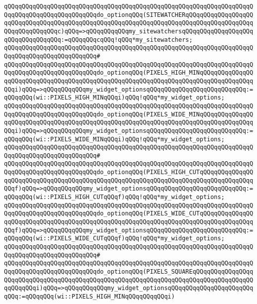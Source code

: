 \verb|qQQqqQQqqQQqqQQqqQQqqQQqqQQqqQQqqQQqqQQqqQQqqQQqqQQqqQQqqQQqqQQqqQQqqQQqqQQqqQQqqQQqqQQqqQQqqQQqdo_optionqQQq(SITEWATCHERqQQqqQQqqQQqqQQqqQQqqQQqqQQqqQQqqQQqqQQqqQQqqQQqqQQqqQQqqQQqqQQqqQQqqQQqqQQqqQQqqQQqqQQqqQQqqQQqqQQqqQQqc)qQQq=>qQQqqQQqqQQqmy_sitewatchersqQQqqQQqqQQqqQQqqQQqqQQqqQQqqQQqqQQq:=qQQqqQQqcqQQq!qQQq*my_sitewatchers;|\newline
\verb|qQQqqQQqqQQqqQQqqQQqqQQqqQQqqQQqqQQqqQQqqQQqqQQqqQQqqQQqqQQqqQQqqQQqqQQqqQQqqQQqqQQqqQQqqQQqqQQq#|\newline
\verb|qQQqqQQqqQQqqQQqqQQqqQQqqQQqqQQqqQQqqQQqqQQqqQQqqQQqqQQqqQQqqQQqqQQqqQQqqQQqqQQqqQQqqQQqqQQqqQQqdo_optionqQQq(PIXELS_HIGH_MINqQQqqQQqqQQqqQQqqQQqqQQqqQQqqQQqqQQqqQQqqQQqqQQqqQQqqQQqqQQqqQQqqQQqqQQqqQQqqQQqqQQqqQQqi)qQQq=>qQQqqQQqqQQqmy_widget_optionsqQQqqQQqqQQqqQQqqQQqqQQqqQQq:=qQQqqQQq(wi::PIXELS_HIGH_MINqQQqi)qQQq!qQQq*my_widget_options;|\newline
\verb|qQQqqQQqqQQqqQQqqQQqqQQqqQQqqQQqqQQqqQQqqQQqqQQqqQQqqQQqqQQqqQQqqQQqqQQqqQQqqQQqqQQqqQQqqQQqqQQqdo_optionqQQq(PIXELS_WIDE_MINqQQqqQQqqQQqqQQqqQQqqQQqqQQqqQQqqQQqqQQqqQQqqQQqqQQqqQQqqQQqqQQqqQQqqQQqqQQqqQQqqQQqqQQqi)qQQq=>qQQqqQQqqQQqmy_widget_optionsqQQqqQQqqQQqqQQqqQQqqQQqqQQq:=qQQqqQQq(wi::PIXELS_WIDE_MINqQQqi)qQQq!qQQq*my_widget_options;|\newline
\verb|qQQqqQQqqQQqqQQqqQQqqQQqqQQqqQQqqQQqqQQqqQQqqQQqqQQqqQQqqQQqqQQqqQQqqQQqqQQqqQQqqQQqqQQqqQQqqQQq#|\newline
\verb|qQQqqQQqqQQqqQQqqQQqqQQqqQQqqQQqqQQqqQQqqQQqqQQqqQQqqQQqqQQqqQQqqQQqqQQqqQQqqQQqqQQqqQQqqQQqqQQqdo_optionqQQq(PIXELS_HIGH_CUTqQQqqQQqqQQqqQQqqQQqqQQqqQQqqQQqqQQqqQQqqQQqqQQqqQQqqQQqqQQqqQQqqQQqqQQqqQQqqQQqqQQqqQQqf)qQQq=>qQQqqQQqqQQqmy_widget_optionsqQQqqQQqqQQqqQQqqQQqqQQqqQQq:=qQQqqQQq(wi::PIXELS_HIGH_CUTqQQqf)qQQq!qQQq*my_widget_options;|\newline
\verb|qQQqqQQqqQQqqQQqqQQqqQQqqQQqqQQqqQQqqQQqqQQqqQQqqQQqqQQqqQQqqQQqqQQqqQQqqQQqqQQqqQQqqQQqqQQqqQQqdo_optionqQQq(PIXELS_WIDE_CUTqQQqqQQqqQQqqQQqqQQqqQQqqQQqqQQqqQQqqQQqqQQqqQQqqQQqqQQqqQQqqQQqqQQqqQQqqQQqqQQqqQQqqQQqf)qQQq=>qQQqqQQqqQQqmy_widget_optionsqQQqqQQqqQQqqQQqqQQqqQQqqQQq:=qQQqqQQq(wi::PIXELS_WIDE_CUTqQQqf)qQQq!qQQq*my_widget_options;|\newline
\verb|qQQqqQQqqQQqqQQqqQQqqQQqqQQqqQQqqQQqqQQqqQQqqQQqqQQqqQQqqQQqqQQqqQQqqQQqqQQqqQQqqQQqqQQqqQQqqQQq#|\newline
\verb|qQQqqQQqqQQqqQQqqQQqqQQqqQQqqQQqqQQqqQQqqQQqqQQqqQQqqQQqqQQqqQQqqQQqqQQqqQQqqQQqqQQqqQQqqQQqqQQqdo_optionqQQq(PIXELS_SQUAREqQQqqQQqqQQqqQQqqQQqqQQqqQQqqQQqqQQqqQQqqQQqqQQqqQQqqQQqqQQqqQQqqQQqqQQqqQQqqQQqqQQqqQQqqQQqqQQqi)qQQq=>qQQqqQQqqQQqmy_widget_optionsqQQqqQQqqQQqqQQqqQQqqQQqqQQq:=qQQqqQQq(wi::PIXELS_HIGH_MINqQQqqQQqqQQqi)|\newline
